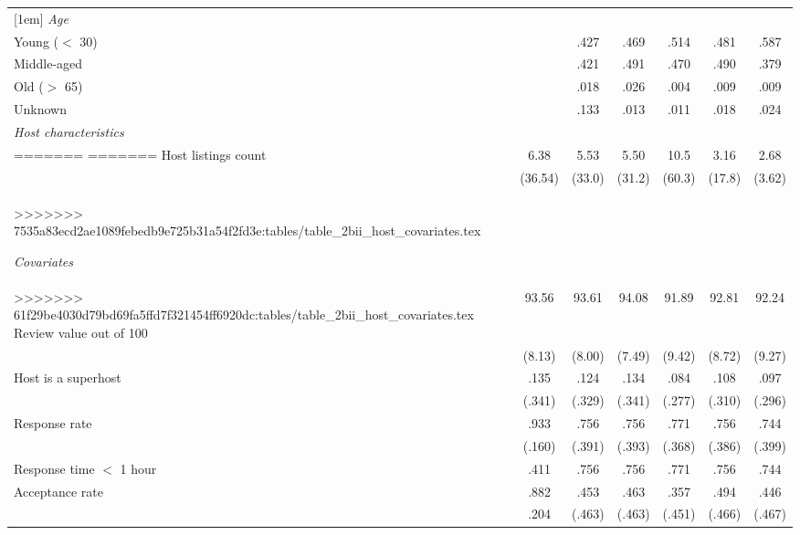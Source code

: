{\begin{longtable}{l*{6}{c}}
		[1em]
		\textit{Age} \\
		Young ($<$ 30)     & &      .427         &       .469         &      .514        &      .481 	& 		.587         \\
		Middle-aged     & &      .421         &       .491        &      .470         &      .490 		& 		.379         \\
		Old ($>$ 65)     & &      .018         &       .026         &      .004         &      .009	& 		.009         \\
		Unknown    &  &      .133         &       .013         &      .011         &      .018 	& 		.024         \\
		[1em]
	
		\textit{Host characteristics} \\
=======
=======
		Host listings count         & 6.38 &      5.53&      5.50 &      10.5&    3.16 & 2.68\\
		& (36.54)	&     (33.0)         &     (31.2)         &     (60.3)         &     (17.8) & 	(3.62)         \\
>>>>>>> 7535a83ecd2ae1089febedb9e725b31a54f2fd3e:tables/table_2bii_host_covariates.tex
		
		\textit{Covariates} \\
>>>>>>> 61f29be4030d79bd69fa5ffd7f321454ff6920dc:tables/table_2bii_host_covariates.tex
		\hline
		Review value out of 100      & 93.56  &      93.61	&      94.08	 	&      91.89		&    92.81	 & 		92.24\\
		              &   (8.13)   &     (8.00)         &     (7.49)         &     (9.42)         &     (8.72) 	&	 (9.27)         \\
		
		Host is a superhost    & .135   &      .124		&      .134&      .084 &      .108  	& 	.097\\
		&(.341) & (.329)     &     (.341)         &     (.277)         &     (.310)         &     (.296)         \\

		Response rate      & .933  &       .756		&       .756		&      .771         &      .756  	& 	.744\\
		& (.160) &     (.391)         &     (.393)         &     (.368)         &     (.386)         &		(.399)\\

		Response time $<$ 1 hour      & .411  &       .756		&       .756		&      .771         &      .756  	& 	.744\\

		Acceptance rate      & .882    &      .453&      .463&       .357         &      .494    &	.446     \\
		&.204 &     (.463)         &     (.463)         &     (.451)         &     (.466)         &		(.467)\\


\end{longtable}}
